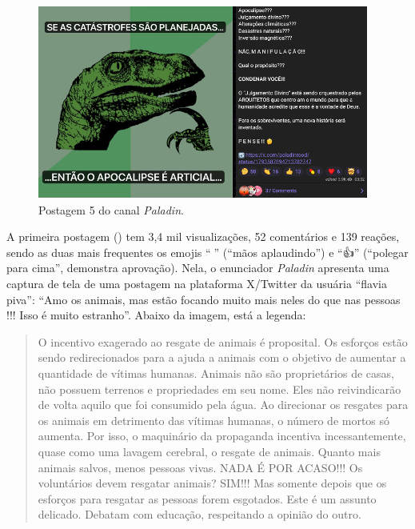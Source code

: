 \documentclass[portuguese]{textolivre}
\begin{document}
\begin{figure}[h!]
    \begin{minipage}[t]{0.50\textwidth}
        \centering
        \includegraphics[width=\linewidth]{Imagens/Fig27.png}
        \caption{Postagem 5 do canal \emph{Paladin}.}
        \label{fig-27}
    \end{minipage}
    
\end{figure}

A primeira postagem () tem 3,4 mil visualizações, 52 comentários e 139 reações, sendo as duas mais frequentes os emojis ``{\Symbola 👏}'' (``mãos aplaudindo'') e ``{\Symbola 👍}'' (``polegar para cima'', demonstra aprovação). Nela, o enunciador \emph{Paladin} apresenta uma captura de tela de uma postagem na plataforma X/Twitter da usuária ``flavia piva'': ``Amo os animais, mas estão focando muito mais neles do que nas pessoas !!! Isso é muito estranho''. Abaixo da imagem, está a legenda:

\begin{quote}
    O incentivo exagerado ao resgate de animais é proposital. Os esforços estão sendo redirecionados para a ajuda a animais com o objetivo de aumentar a quantidade de vítimas humanas. Animais não são proprietários de casas, não possuem terrenos e propriedades em seu nome. Eles não reivindicarão de volta aquilo que foi consumido pela água. Ao direcionar os resgates para os animais em detrimento das vítimas humanas, o número de mortos só aumenta. Por isso, o maquinário da propaganda incentiva incessantemente, quase como uma lavagem cerebral, o resgate de animais. Quanto mais animais salvos, menos pessoas vivas. NADA É POR ACASO!!! Os voluntários devem resgatar animais? SIM!!! Mas somente depois que os esforços para resgatar as pessoas forem esgotados. Este é um assunto delicado. Debatam com educação, respeitando a opinião do outro.
\end{quote}
\end{document}
